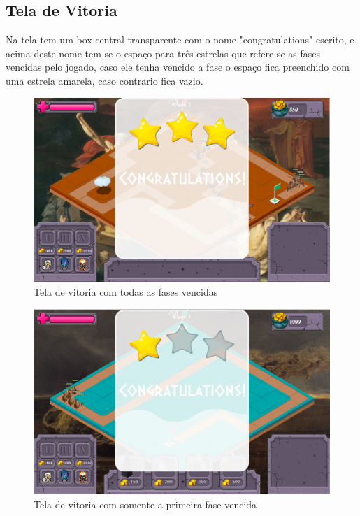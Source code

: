 \documentclass[11pt]{article} %
\begin{document}
\subsection{Tela de Vitoria}

Na tela tem um box central transparente com o nome "congratulations" escrito, e acima deste nome tem-se o espaço para três estrelas que refere-se as fases vencidas pelo jogado, caso ele tenha vencido a fase o espaço fica preenchido com uma estrela amarela, caso contrario fica vazio.

\begin{figure}[!htp]
\centering
\includegraphics[scale=0.3]{res/win_display_all.png}
\caption{Tela de vitoria com todas as fases vencidas}
\label{Logo da SDL}
\end{figure}

\begin{figure}[!htp]
\centering
\includegraphics[scale=0.3]{res/win_display_fase1.png}
\caption{Tela de vitoria com somente a primeira fase vencida}
\label{Logo da SDL}
\end{figure}
\end{document}
